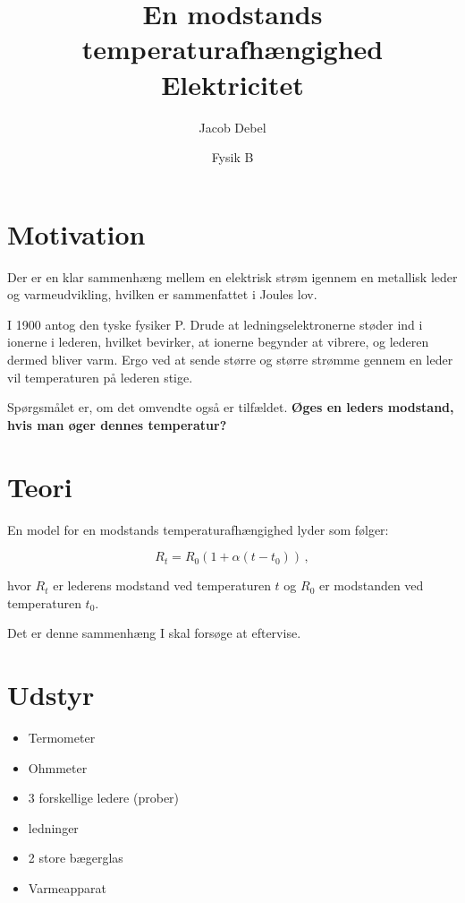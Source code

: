 \documentclass[a4paper, 12pt]{article}
\author{Jacob Debel}
\date{Fysik B}
\title{En modstands temperaturafhængighed\\\medskip
\large Elektricitet}
\begin{document}
\maketitle

\section*{Motivation}
\label{sec:orgdf66835}
Der er en klar sammenhæng mellem en elektrisk strøm igennem en metallisk leder og varmeudvikling, hvilken er sammenfattet i Joules lov.

I 1900 antog den tyske fysiker P. Drude at ledningselektronerne støder ind i ionerne i lederen, hvilket bevirker, at ionerne begynder at vibrere, og lederen dermed bliver varm.
Ergo ved at sende større og større strømme gennem en leder vil temperaturen på lederen stige.

Spørgsmålet er, om det omvendte også er tilfældet. \textbf{Øges en leders modstand, hvis man øger dennes temperatur?}

\section*{Teori}
\label{sec:org8eda2f1}
En model for en modstands temperaturafhængighed lyder som følger:

$$R_t = R_0 \left( 1 + \alpha \left( t - t_0 \right) \right)\,,$$

hvor \(R_t\) er lederens modstand ved temperaturen \(t\) og \(R_0\) er modstanden ved temperaturen \(t_0\).

Det er denne sammenhæng I skal forsøge at eftervise.


\section*{Udstyr}
\label{sec:org656e7a9}
\begin{itemize}
\item Termometer
\item Ohmmeter
\item 3 forskellige ledere (prober)
\item ledninger
\item 2 store bægerglas
\item Varmeapparat
\end{itemize}
\end{document}
